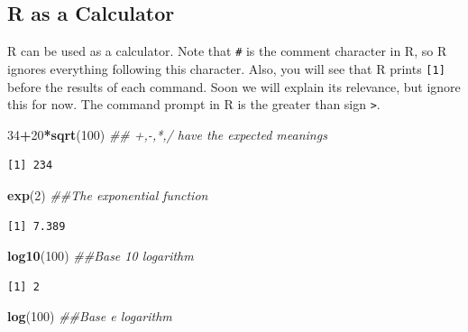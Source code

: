 \documentclass[
]{krantz}
\makeatletter
\newenvironment{Shaded}{\begin{snugshade}}{\end{snugshade}}
\newcommand{\CommentTok}[1]{\textcolor[rgb]{0.37,0.37,0.37}{\textit{#1}}}
\newcommand{\DecValTok}[1]{\textcolor[rgb]{0.06,0.06,0.06}{#1}}
\newcommand{\KeywordTok}[1]{\textcolor[rgb]{0.27,0.27,0.27}{\textbf{#1}}}
\newcommand{\NormalTok}[1]{#1}
\newcommand{\OperatorTok}[1]{\textcolor[rgb]{0.43,0.43,0.43}{\textbf{#1}}}
\newenvironment{kframe}{%
\medskip{}
\setlength{\fboxsep}{.8em}
 \def\at@end@of@kframe{}%
 \ifinner\ifhmode%
  \def\at@end@of@kframe{\end{minipage}}%
  \begin{minipage}{\columnwidth}%
 \fi\fi%
 \def\FrameCommand##1{\hskip\@totalleftmargin \hskip-\fboxsep
 \colorbox{shadecolor}{##1}\hskip-\fboxsep
     \hskip-\linewidth \hskip-\@totalleftmargin \hskip\columnwidth}%
 \MakeFramed {\advance\hsize-\width
   \@totalleftmargin\z@ \linewidth\hsize
   \@setminipage}}%
 {\par\unskip\endMakeFramed%
 \at@end@of@kframe}
\renewenvironment{Shaded}{\begin{kframe}}{\end{kframe}}
\makeatother
\begin{document}
\hypertarget{r-as-a-calculator}{%
\subsection{R as a Calculator}\label{r-as-a-calculator}}

R can be used as a calculator. Note that \texttt{\#} is the comment character in R, so R ignores everything following this character. Also, you will see that R prints \texttt{{[}1{]}} before the results of each command. Soon we will explain its relevance, but ignore this for now. The command prompt in R is the greater than sign \texttt{\textgreater{}}.

\begin{Shaded}
\begin{Highlighting}[]
\DecValTok{34}\OperatorTok{+}\DecValTok{20}\OperatorTok{*}\KeywordTok{sqrt}\NormalTok{(}\DecValTok{100}\NormalTok{)  }\CommentTok{\#\# +,{-},*,/ have the expected meanings}
\end{Highlighting}
\end{Shaded}

\begin{verbatim}
[1] 234
\end{verbatim}

\begin{Shaded}
\begin{Highlighting}[]
\KeywordTok{exp}\NormalTok{(}\DecValTok{2}\NormalTok{)  }\CommentTok{\#\#The exponential function}
\end{Highlighting}
\end{Shaded}

\begin{verbatim}
[1] 7.389
\end{verbatim}

\begin{Shaded}
\begin{Highlighting}[]
\KeywordTok{log10}\NormalTok{(}\DecValTok{100}\NormalTok{)  }\CommentTok{\#\#Base 10 logarithm}
\end{Highlighting}
\end{Shaded}

\begin{verbatim}
[1] 2
\end{verbatim}

\begin{Shaded}
\begin{Highlighting}[]
\KeywordTok{log}\NormalTok{(}\DecValTok{100}\NormalTok{)  }\CommentTok{\#\#Base e logarithm}
\end{Highlighting}
\end{Shaded}
\end{document}
